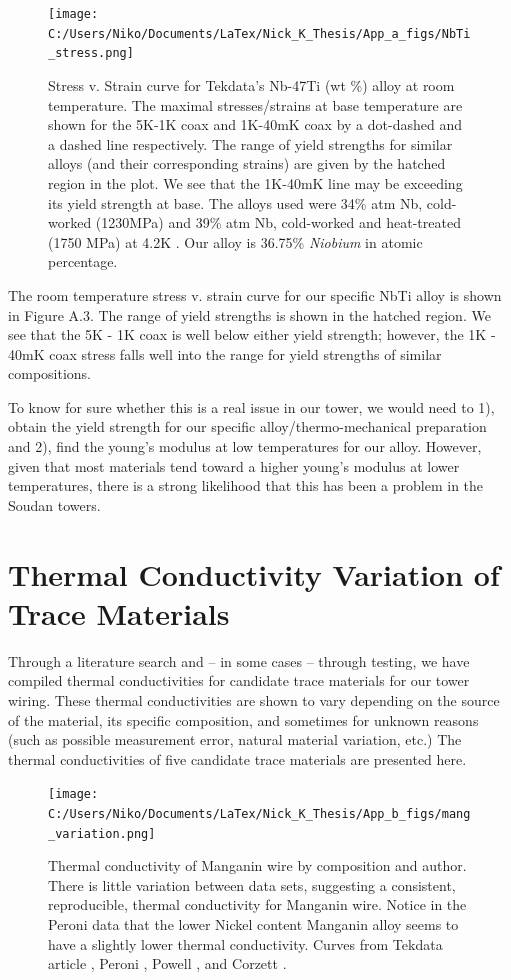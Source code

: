 \documentclass{report}
\begin{document}
\begin{appendices}
\begin{figure}[h]
\centering
\texttt{[image: C:/Users/Niko/Documents/LaTex/Nick\_K\_Thesis/App\_a\_figs/NbTi\_stress.png]}
\caption{Stress v. Strain curve for Tekdata's Nb-47Ti (wt \%) alloy at room temperature. The maximal stresses/strains at base temperature are shown for the 5K-1K coax and 1K-40mK coax by a dot-dashed and a dashed line respectively. The range of yield strengths for similar alloys (and their corresponding strains) are given by the hatched region in the plot.  We see that the 1K-40mK line may be exceeding its yield strength at base. The alloys used were 34\% atm Nb, cold-worked (1230MPa) and 39\% atm Nb, cold-worked and heat-treated (1750 MPa) at 4.2K \cite{Collings1986}. Our alloy is 36.75\% \emph{Niobium} in atomic percentage.}
\end{figure}

The room temperature stress v. strain curve for our specific NbTi alloy is shown in Figure A.3. The range of yield strengths is shown in the hatched region. We see that the 5K - 1K coax is well below either yield strength; however, the 1K - 40mK coax stress falls well into the range for yield strengths of similar compositions.

To know for sure whether this is a real issue in our tower, we would need to 1), obtain the yield strength for our specific alloy/thermo-mechanical preparation and 2), find the young's modulus at low temperatures for our alloy. However, given that most materials tend toward a higher young's modulus at lower temperatures, there is a strong likelihood that this has been a problem in the Soudan towers.


\chapter{Thermal Conductivity Variation of Trace Materials}

Through a literature search and -- in some cases -- through testing, we have compiled thermal conductivities for candidate trace materials for our tower wiring. These thermal conductivities are shown to vary depending on the source of the material, its specific composition, and sometimes for unknown reasons (such as possible measurement error, natural material variation, etc.) The thermal conductivities of five candidate trace materials are presented here.

\begin{figure}[h]
\centering
\texttt{[image: C:/Users/Niko/Documents/LaTex/Nick\_K\_Thesis/App\_b\_figs/mang\_variation.png]}
\caption{Thermal conductivity of Manganin wire by composition and author. There is little variation between data sets, suggesting a consistent, reproducible, thermal conductivity for Manganin wire. Notice in the Peroni data that the lower Nickel content Manganin alloy seems to have a slightly lower thermal conductivity. Curves from Tekdata article \cite{Blake}, Peroni \cite{Peroni1999}, Powell \cite{tou}, and Corzett \cite{cor}.}
\end{figure}


\end{appendices}
\end{document}
